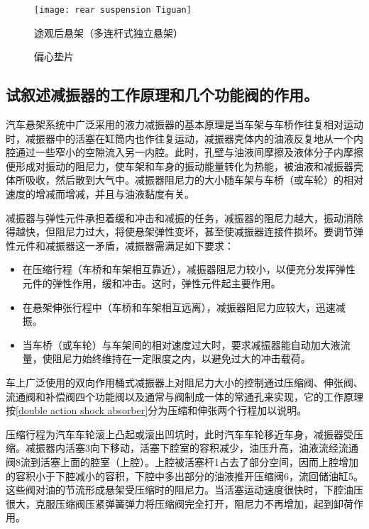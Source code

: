 \documentclass[UTF8]{ctexart}
\numberwithin{figure}{section}
\numberwithin{table}{section}
\begin{document}
\begin{figure}[htbp]
	\centering
	\begin{minipage}[b]{0.9\textwidth}
		\centering
		\texttt{[image: rear suspension Tiguan]}
		\caption{途观后悬架（多连杆式独立悬架）}
		\label{rear suspension Tiguan}
	\end{minipage}
	\begin{minipage}[b]{\textwidth}
		\centering
		\caption{偏心垫片}
		\label{eccentric gasket}
	\end{minipage}
\end{figure}

\subsection{试叙述减振器的工作原理和几个功能阀的作用。}

汽车悬架系统中广泛采用的液力减振器的基本原理是当车架与车桥作往复相对运动时，减振器中的活塞在缸筒内也作往复运动，减振器壳体内的油液反复地从一个内腔通过一些窄小的空隙流入另一内腔。此时，孔壁与油液间摩擦及液体分子内摩擦便形成对振动的阻尼力，使车架和车身的振动能量转化为热能，被油液和减振器壳体所吸收，然后散到大气中。减振器阻尼力的大小随车架与车桥（或车轮）的相对速度的增减而增减，并且与油液黏度有关。

减振器与弹性元件承担着缓和冲击和减振的任务，减振器的阻尼力越大，振动消除得越快，但阻尼力过大，将使悬架弹性变坏，甚至使减振器连接件损坏。要调节弹性元件和减振器这一矛盾，减振器需满足如下要求：
\begin{itemize}
	\item 在压缩行程（车桥和车架相互靠近），减振器阻尼力较小，以便充分发挥弹性元件的弹性作用，缓和冲击。这时，弹性元件起主要作用。
	\item 在悬架伸张行程中（车桥和车架相互远离），减振器阻尼力应较大，迅速减振。
	\item 当车桥（或车轮）与车架间的相对速度过大时，要求减振器能自动加大液流量，使阻尼力始终维持在一定限度之内，以避免过大的冲击载荷。
\end{itemize}

车上广泛使用的双向作用桶式减振器上对阻尼力大小的控制通过压缩阀、伸张阀、流通阀和补偿阀四个功能阀以及通常与阀制成一体的常通孔来实现，它的工作原理按\cref{double action shock absorber}分为压缩和伸张两个行程加以说明。

压缩行程为汽车车轮滚上凸起或滚出凹坑时，此时汽车车轮移近车身，减振器受压缩。减振器内活塞3向下移动，活塞下腔室的容积减少，油压升高，油液流经流通阀8流到活塞上面的腔室（上腔）。上腔被活塞杆1占去了部分空间，因而上腔增加的容积小于下腔减小的容积，下腔中多出部分的油液推开压缩阀6，流回储油缸5。这些阀对油的节流形成悬架受压缩时的阻尼力。当活塞运动速度很快时，下腔油压很大，克服压缩阀压紧弹簧弹力将压缩阀完全打开，阻尼力不再增加，起到卸荷作用。
\end{document}
